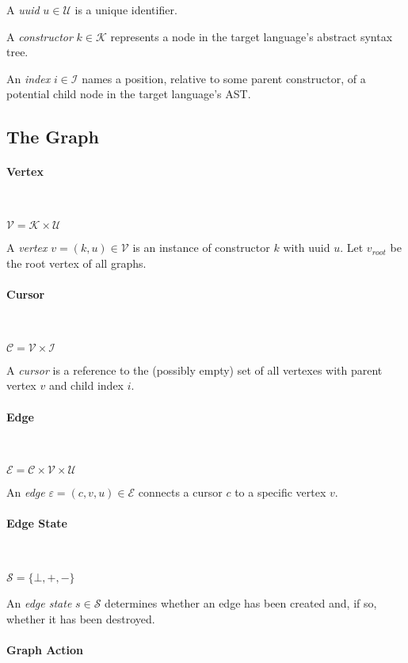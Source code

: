 \documentclass[letterpaper,12pt]{article}
\def\C{\mathcal{C}}
\def\E{\mathcal{E}}
\def\I{\mathcal{I}}
\def\K{\mathcal{K}}
\def\S{\mathcal{S}}
\def\U{\mathcal{U}}
\def\V{\mathcal{V}}
\def\e{\varepsilon}
\begin{document}
A \emph{uuid} $u \in \U$ is a unique identifier.

A \emph{constructor} $k \in \K$ represents a node in the target language's
abstract syntax tree.

An \emph{index} $i \in \I$ names a position, relative to some parent
constructor, of a potential child node in the target language's AST.


\subsection{The Graph}
\label{sec:the-graph}

\paragraph{Vertex} ~

$\V = \K \times \U$

A \emph{vertex} $v = (k, u) \in \V$ is an instance of constructor $k$ with
uuid $u$. Let $v_{root}$ be the root vertex of all graphs.

\paragraph{Cursor} ~

$\C = \V \times \I$

A \emph{cursor} is a reference to the (possibly empty) set of all vertexes
with parent vertex $v$ and child index $i$.

\paragraph{Edge} ~

$\E = \C \times \V \times \U$

An \emph{edge} $\e = (c, v, u) \in \E$ connects a cursor $c$ to a specific
vertex $v$.

\paragraph{Edge State} ~

$\S = \{\bot,+,-\}$

An \emph{edge state} $s \in \S$ determines whether an edge has been created
and, if so, whether it has been destroyed.

\paragraph{Graph Action} ~
\end{document}
